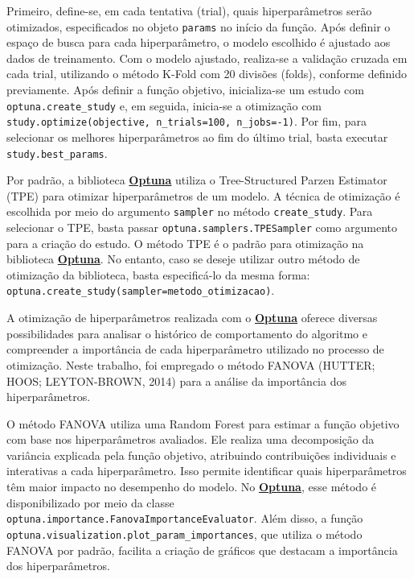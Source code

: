 \documentclass[
  12pt,
  a4paper,
]{scrreprt}
\begin{document}
Primeiro, define-se, em cada tentativa (trial), quais hiperparâmetros
serão otimizados, especificados no objeto \texttt{params} no início da
função. Após definir o espaço de busca para cada hiperparâmetro, o
modelo escolhido é ajustado aos dados de treinamento. Com o modelo
ajustado, realiza-se a validação cruzada em cada trial, utilizando o
método K-Fold com 20 divisões (folds), conforme definido previamente.
Após definir a função objetivo, inicializa-se um estudo com
\texttt{optuna.create\_study} e, em seguida, inicia-se a otimização com
\texttt{study.optimize(objective,\ n\_trials=100,\ n\_jobs=-1)}. Por
fim, para selecionar os melhores hiperparâmetros ao fim do último trial,
basta executar \texttt{study.best\_params}.

\vspace{12pt}

Por padrão, a biblioteca \href{https://optuna.org/}{\textbf{Optuna}}
utiliza o Tree-Structured Parzen Estimator (TPE) para otimizar
hiperparâmetros de um modelo. A técnica de otimização é escolhida por
meio do argumento \texttt{sampler} no método \texttt{create\_study}.
Para selecionar o TPE, basta passar \texttt{optuna.samplers.TPESampler}
como argumento para a criação do estudo. O método TPE é o padrão para
otimização na biblioteca \href{https://optuna.org/}{\textbf{Optuna}}. No
entanto, caso se deseje utilizar outro método de otimização da
biblioteca, basta especificá-lo da mesma forma:
\texttt{optuna.create\_study(sampler=metodo\_otimizacao)}.

\vspace{12pt}

A otimização de hiperparâmetros realizada com o
\href{https://optuna.org/}{\textbf{Optuna}} oferece diversas
possibilidades para analisar o histórico de comportamento do algoritmo e
compreender a importância de cada hiperparâmetro utilizado no processo
de otimização. Neste trabalho, foi empregado o método FANOVA (HUTTER;
HOOS; LEYTON-BROWN, 2014) para a análise da importância dos
hiperparâmetros.

\vspace{12pt}

O método FANOVA utiliza uma Random Forest para estimar a função objetivo
com base nos hiperparâmetros avaliados. Ele realiza uma decomposição da
variância explicada pela função objetivo, atribuindo contribuições
individuais e interativas a cada hiperparâmetro. Isso permite
identificar quais hiperparâmetros têm maior impacto no desempenho do
modelo. No \href{https://optuna.org/}{\textbf{Optuna}}, esse método é
disponibilizado por meio da classe
\texttt{optuna.importance.FanovaImportanceEvaluator}. Além disso, a
função \texttt{optuna.visualization.plot\_param\_importances}, que
utiliza o método FANOVA por padrão, facilita a criação de gráficos que
destacam a importância dos hiperparâmetros.
\end{document}
